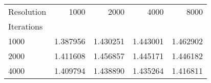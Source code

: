 \begin{tabular}{lrrrr}
	\toprule
	Resolution & 1000     & 2000     & 4000     & 8000     \\
	Iterations &          &          &          &          \\
	\midrule
	1000       & 1.387956 & 1.430251 & 1.443001 & 1.462902 \\
	2000       & 1.411608 & 1.456857 & 1.445171 & 1.446182 \\
	4000       & 1.409794 & 1.438890 & 1.435264 & 1.416811 \\
	\bottomrule
\end{tabular}
